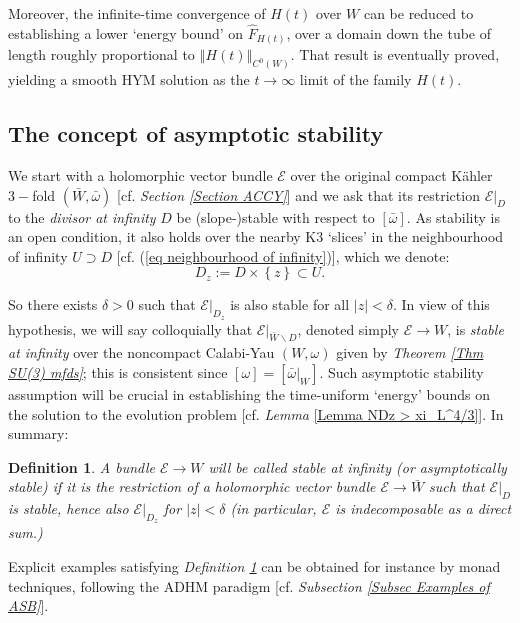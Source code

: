 \documentclass{article}
\newtheorem{definition}[theorem]{Definition}
\begin{document}
Moreover, the infinite-time convergence of $H\left(
t\right) $ over $W$  can be
reduced to establishing a lower `energy bound' on $\hat{F}_{H(t)}$, over a
domain down the tube of length roughly proportional to $\left\Vert H(t)\right\Vert_{C^0(W)}$. That result  is  eventually proved, yielding a smooth HYM solution as the $t\to\infty$ limit of the family $H(t)$.


\subsection{The concept of asymptotic stability}
We start with a holomorphic vector bundle $\mathcal{E}$
over the original compact K\"{a}hler $3-$fold $\left( \bar{W},\bar{\omega}%
\right) $ [cf. \emph{Section \ref{Section ACCY}}] and we ask that its
restriction  $\left. \mathcal{E}\right\vert _{D}$ to the \emph{divisor at infinity} $D$ be (slope-)stable with respect to $\left[ \bar{\omega}\right] $. As stability is an open condition, it also holds over the nearby K3 `slices' in the neighbourhood of infinity $U\supset D$ [cf. (\ref{eq neighbourhood of infinity})], which we denote:
$$
D_z:=D\times\left\{ z \right\}\subset U.
$$

So there exists $\delta >0$
such that $\left. \mathcal{E}\right\vert _{D_{z}}$ is also stable for all $%
\left\vert z\right\vert <\delta $. In view of this hypothesis, we will say
colloquially that $\left. \mathcal{E}\right\vert _{\bar{W}\smallsetminus D}$, denoted simply $\mathcal{E}\rightarrow W$, is \emph{stable at
infinity }over the noncompact Calabi-Yau $\left( W,\omega \right) $ given by 
\emph{Theorem \ref{Thm SU(3) mfds}}; this is consistent since $\left[
\omega \right] =\left[ \left. \bar{\omega}\right\vert _{W}\right] $. Such asymptotic stability assumption will be crucial in establishing the time-uniform `energy' bounds on the solution to the evolution problem [cf. \emph{Lemma }\ref{Lemma NDz > xi_L^4/3}]. In
summary:

\begin{definition}
\label{def bundle E->W}A bundle $\mathcal{E}\rightarrow W$ will be called 
\emph{stable at infinity} (or \emph{asymptotically stable}) if it is the
restriction of a holomorphic vector bundle $\mathcal{E}\rightarrow \bar{W}$
such that $\left. \mathcal{E}\right\vert _{D}$ is stable, hence also $\left. \mathcal{E}\right\vert _{D_{z}}$ for $\left\vert z\right\vert <\delta $ (in particular, $\mathcal{E}$ is indecomposable as a direct sum.)%
\end{definition}
Explicit examples satisfying \emph{Definition \ref{def bundle E->W}} can be obtained for instance by monad techniques, following the ADHM paradigm [cf. \emph{Subsection \ref{Subsec Examples of ASB}}]. 
\end{document}
